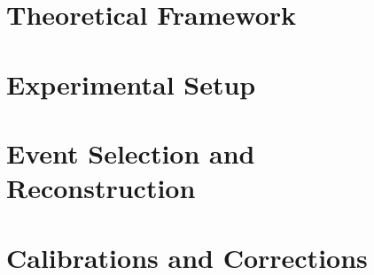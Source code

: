 \documentclass[12pt,a4paper,reqno,twoside,final]{scrbook}%
\numberwithin{equation}{subsection}
\begin{document}
\chapter{Theoretical Framework}
\label{ch:theory}


\chapter{Experimental Setup}
\label{ch:expsetup}


\chapter{Event Selection and Reconstruction}
\label{ch:selectionreco}


\chapter{Calibrations and Corrections}
\label{ch:calibcorr}


\end{document}
